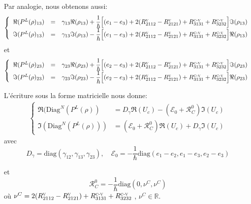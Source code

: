 \documentclass[12pt,a4paper,openany,oneside]{book}
\begin{document}
{{{{{{Par analogie, nous obtenons aussi:
$$\left\{
   \begin{array}{rcl}
\Re(P^{L}(\rho)_{13}) & = & \gamma_{13}\Re(\rho_{13})+\dfrac{1}{\hbar}\Big[(e_{1}-e_{3})+ 2(R^{\textsc{v}}_{2112}-R^{\textsc{v}}_{2121}) + R^{\textsc{c-v}}_{3131} + R^{\textsc{c-v}}_{3232}\Big]\Im(\rho_{13}) \\
\Im(P^{L}(\rho)_{13}) & = & \gamma_{13}\Im(\rho_{13})-\dfrac{1}{\hbar}\Big[(e_{1}-e_{3})+ 2(R^{\textsc{v}}_{2112}-R^{\textsc{v}}_{2121})+R^{\textsc{c-v}}_{3131} + R^{\textsc{c-v}}_{3232}\Big]\Re(\rho_{13}) 
   \end{array}
 \right. $$
et 
$$\left\{
   \begin{array}{rcl}
\Re(P^{L}(\rho)_{23}) & = & \gamma_{23}\Re(\rho_{23})+\dfrac{1}{\hbar}\Big[(e_{2}-e_{3})+2(R^{\textsc{v}}_{2112}-R^{\textsc{v}}_{2121}) + R^{\textsc{c-v}}_{3131} + R^{\textsc{c-v}}_{3232}\Big]\Im(\rho_{23}) \\
\Im(P^{L}(\rho)_{23}) & = & \gamma_{23}\Im(\rho_{23})-\dfrac{1}{\hbar}\Big[(e_{2}-e_{3})+2(R^{\textsc{v}}_{2112}-R^{\textsc{v}}_{2121})+R^{\textsc{c-v}}_{3131} + R^{\textsc{c-v}}_{3232}\Big]\Re(\rho_{23}) 
   \end{array}
 \right. $$

L'écriture sous la forme matricielle nous donne:
\begin{eqnarray}\label{FM2}
\left\{
\begin{split}
\Re(\textrm{Diag}^{N}(P^{L}(\rho)) &= D_{\gamma}\Re(U_{c})-(\mathcal{E}_{0}+ \mathcal{R}^{0}_{C})\Im(U_{c})\\
\Im(\textrm{Diag}^{N}(P^{L}(\rho))) &= (\mathcal{E}_{0}+ \mathcal{R}^{0}_{C})\Re(U_{c})+D_{\gamma}\Im(U_{c})
\end{split}
\right.
\end{eqnarray}
avec 
$$ D_{\gamma} = \textrm{diag}(\gamma_{12},\gamma_{13}, \gamma_{23}), \quad \mathcal{E}_{0} = - \dfrac{1}{\hbar}  \textrm{diag}(e_{1}-e_{2},e_{1}-e_{3}, e_{2}-e_{3}) $$

et 
$$ \mathcal{R}^{0}_{C} =- \dfrac{1}{\hbar}  \textrm{diag}(0,\nu^{C}, \nu^{C})$$
où \quad
  $ \nu^{C} = 2(R^{\textsc{v}}_{2112}-R^{\textsc{v}}_{2121})+R^{\textsc{c-v}}_{3131} + R^{\textsc{c-v}}_{3232} $ , $ \nu^{C} \in \mathbb{R}. $\\

}}}}}}
\end{document}
